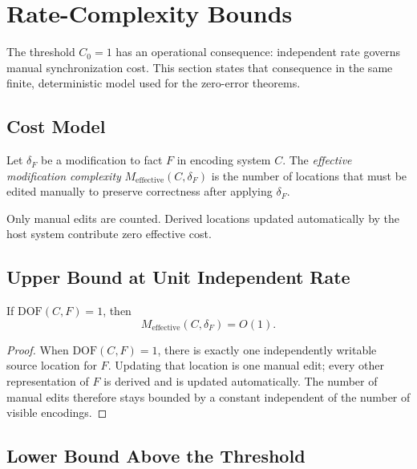 \section{Rate-Complexity Bounds}\label{sec:bounds}

The threshold $C_0=1$ has an operational consequence: independent rate governs manual synchronization cost. This section states that consequence in the same finite, deterministic model used for the zero-error theorems.

\subsection{Cost Model}\label{sec:cost-model}

\begin{definition}\label{def:cost-model}
Let $\delta_F$ be a modification to fact $F$ in encoding system $C$. The \emph{effective modification complexity} $M_{\mathrm{effective}}(C,\delta_F)$ is the number of locations that must be edited manually to preserve correctness after applying $\delta_F$.
\end{definition}

Only manual edits are counted. Derived locations updated automatically by the host system contribute zero effective cost.

\subsection{Upper Bound at Unit Independent Rate}\label{sec:upper-bound}

\begin{theorem}\label{thm:upper-bound}
If $\text{DOF}(C,F)=1$, then
\[
M_{\mathrm{effective}}(C,\delta_F)=O(1).
\]
\end{theorem}

\begin{proof}
When $\text{DOF}(C,F)=1$, there is exactly one independently writable source location for $F$. Updating that location is one manual edit; every other representation of $F$ is derived and is updated automatically. The number of manual edits therefore stays bounded by a constant independent of the number of visible encodings.
\end{proof}

\subsection{Lower Bound Above the Threshold}\label{sec:lower-bound}

